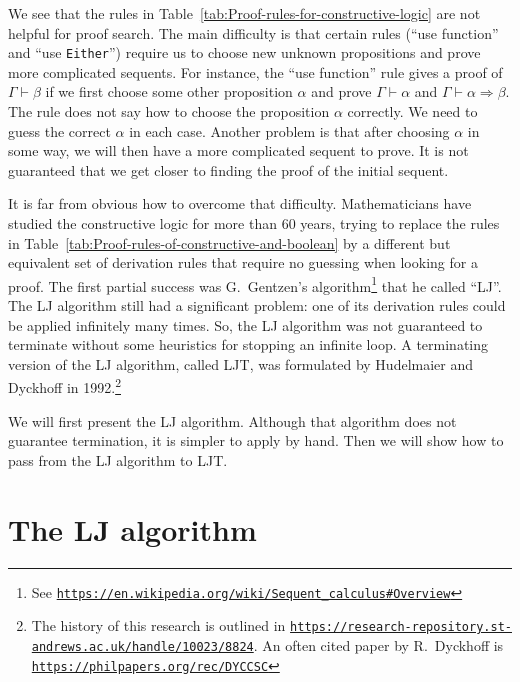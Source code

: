 We see that the rules in Table~\ref{tab:Proof-rules-for-constructive-logic}
are not helpful for proof search. The main difficulty is that certain
rules (\textsf{``}use function\textsf{''} and \textsf{``}use \lstinline!Either!\textsf{''}) require
us to choose new unknown propositions and prove more complicated sequents.
For instance, the \textsf{``}use function\textsf{''} rule gives a proof of $\Gamma\vdash\beta$
if we first choose some other proposition $\alpha$ and prove $\Gamma\vdash\alpha$
and $\Gamma\vdash\alpha\Rightarrow\beta$. The rule does not say how
to choose the proposition $\alpha$ correctly. We need to guess the
correct $\alpha$ in each case. Another problem is that after choosing
$\alpha$ in some way, we will then have a more complicated sequent
to prove. It is not guaranteed that we get closer to finding the proof
of the initial sequent. 

It is far from obvious how to overcome that difficulty. Mathematicians
have studied the constructive logic for more than 60 years, trying
to replace the rules in Table~\ref{tab:Proof-rules-of-constructive-and-boolean}
by a different but equivalent set of derivation rules that require
no guessing when looking for a proof. The first partial success was
G.~Gentzen\textsf{'}s algorithm\footnote{See \texttt{\href{https://en.wikipedia.org/wiki/Sequent_calculus\#Overview}{https://en.wikipedia.org/wiki/Sequent\_calculus\#Overview}}}
that he called \textsf{``}LJ\textsf{''}. The LJ algorithm
still had a significant problem: one of its derivation rules could
be applied infinitely many times. So, the LJ algorithm was not guaranteed
to terminate without some heuristics for stopping an infinite loop.
A terminating version of the LJ algorithm, called LJT,
was formulated by Hudelmaier and Dyckhoff in 1992.\footnote{The history of this research is outlined in \texttt{\href{https://research-repository.st-andrews.ac.uk/handle/10023/8824}{https://research-repository.st-andrews.ac.uk/handle/10023/8824}}.
An often cited paper by R.~Dyckhoff is \texttt{\href{https://philpapers.org/rec/DYCCSC}{https://philpapers.org/rec/DYCCSC}}} 

We will first present the LJ algorithm. Although that algorithm does
not guarantee termination, it is simpler to apply by hand. Then we
will show how to pass from the LJ algorithm to LJT.

\section{The LJ algorithm}


